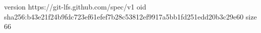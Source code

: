 version https://git-lfs.github.com/spec/v1
oid sha256:b43e21f24b9fdc723ef61efef7b28c53812ef9917a5bb1fd251edd20b3c29e60
size 66
